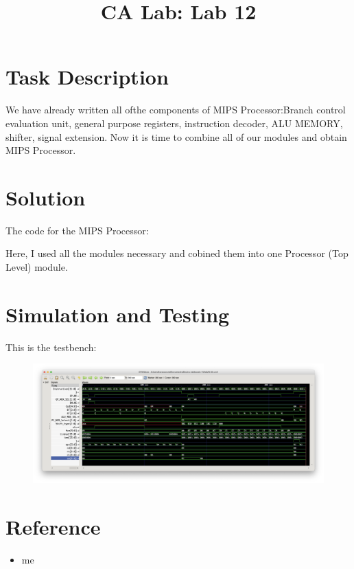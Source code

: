 \documentclass{../../../template}
\title{CA Lab: Lab 12}
\begin{document}
    \maketitle

    \section*{Task Description}

    We have already written all ofthe components of MIPS Processor:Branch control evaluation unit, general purpose registers, instruction decoder, ALU MEMORY, shifter, signal extension. Now it is time to combine all of our modules and obtain MIPS Processor.

    \section*{Solution}

    The code for the MIPS Processor:

    

    Here, I used all the modules necessary and cobined them into one Processor (Top Level) module.

    \section*{Simulation and Testing}

    This is the testbench:

    

    \begin{figure}[H]
        \includegraphics[width=12cm]{diagram.png}
    \end{figure}

    \section*{Reference}

    \begin{itemize}
        \item me
    \end{itemize}
\end{document}
